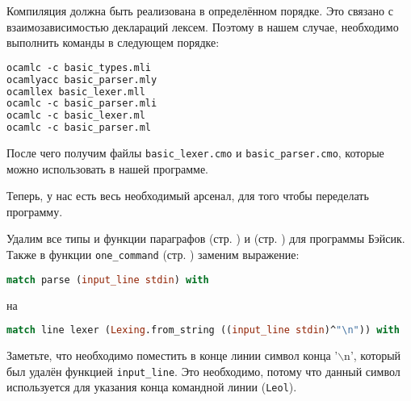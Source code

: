 Компиляция должна быть реализована в определённом порядке. Это связано с
взаимозависимостью деклараций лексем. Поэтому в нашем случае, необходимо
выполнить команды в следующем порядке:

\begin{lstlisting}[language=OCaml]
ocamlc -c basic_types.mli
ocamlyacc basic_parser.mly
ocamllex basic_lexer.mll
ocamlc -c basic_parser.mli
ocamlc -c basic_lexer.ml
ocamlc -c basic_parser.ml
\end{lstlisting}

После чего получим файлы \texttt{basic\_lexer.cmo} и \texttt{basic\_parser.cmo},
которые можно использовать в нашей программе.

Теперь, у нас есть весь необходимый арсенал, для того чтобы переделать
программу.

Удалим все типы и функции параграфов  (стр.
\pageref{??}) и  (стр. \pageref{??}) для программы
Бэйсик. Также в функции \texttt{one\_command} (стр. \pageref{??}) заменим
выражение:

\begin{lstlisting}[language=OCaml]
match parse (input_line stdin) with
\end{lstlisting}

на

\begin{lstlisting}[language=OCaml]
match line lexer (Lexing.from_string ((input_line stdin)^"\n")) with
\end{lstlisting}

Заметьте, что необходимо поместить в конце линии символ конца '$\backslash$n',
который был удалён функцией \texttt{input\_line}. Это необходимо, потому что
данный символ используется для указания конца командной линии (\texttt{Leol}).